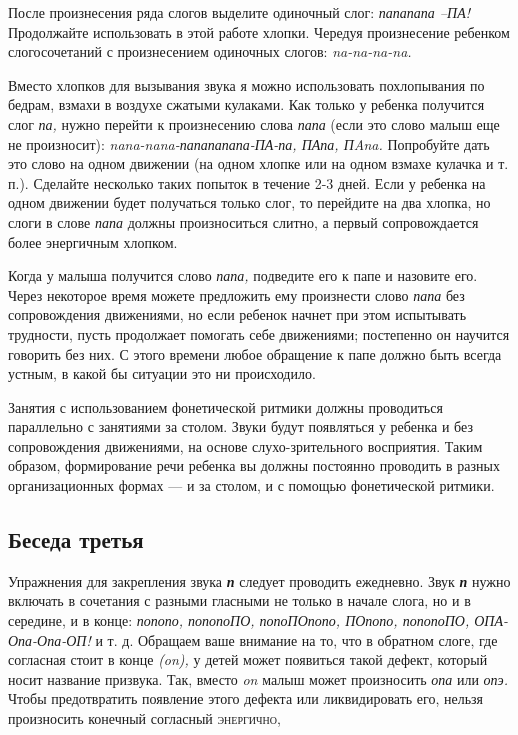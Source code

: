 \documentclass[a5paper]{book}
\renewcommand{\emph}[1]{\textit{#1}}
\begin{document}
После произнесения ряда слогов выделите одиночный слог: \emph{папапапа
--ПА!} Продолжайте использовать в этой работе хлопки. Чередуя
произнесение ребенком слогосочетаний с произнесением одиночных слогов:
\emph{na-na-na-na.}

Вместо хлопков для вызывания звука я можно использовать похлопывания по
бедрам, взмахи в воздухе сжатыми кулаками. Как только у ребенка
получится слог \emph{па,} нужно перейти к произнесению слова \emph{папа}
(если это слово малыш еще не произносит):
\emph{nana-nana-папапапапа-ПА-па, ПАпа, ПAna.} Попробуйте дать это слово
на одном движении (на одном хлопке или на одном взмахе кулачка и т. п.).
Сделайте несколько таких попыток в течение 2-3 дней. Если у ребенка на
одном движении будет получаться только слог, то перейдите на два хлопка,
но слоги в слове \emph{папа} должны произноситься слитно, а первый
сопровождается более энергичным хлопком.

Когда у малыша получится слово \emph{папа,} подведите его к папе и
назовите его. Через некоторое время можете предложить ему произнести
слово \emph{папа} без сопровождения движениями, но если ребенок начнет
при этом испытывать трудности, пусть продолжает помогать себе
движениями; постепенно он научится говорить без них. С этого времени
любое обращение к папе должно быть всегда устным, в какой бы ситуации
это ни происходило.

Занятия с использованием фонетической ритмики должны проводиться
параллельно с занятиями за столом. Звуки будут появляться у ребенка и
без сопровождения движениями, на основе слухо-зрительного восприятия.
Таким образом, формирование речи ребенка вы должны постоянно проводить в
разных организационных формах --- и за столом, и с помощью фонетической
ритмики.

\subsection*{Беседа третья}

Упражнения для закрепления звука \emph{\textbf{п}} следует проводить
ежедневно. Звук \emph{\textbf{п}} нужно включать в сочетания с разными
гласными не только в начале слога, но и в середине, и в конце:
\emph{попопо, попопоПО, попоПОпопо, ПОпопо, попопоПО, ОПА-Опа-Опа-ОП!} и
т. д. Обращаем ваше внимание на то, что в обратном слоге, где согласная
стоит в конце \emph{(on),} у детей может появиться такой дефект, который
носит название призвука. Так, вместо \emph{on} малыш может произносить
\emph{опа} или \emph{опэ.} Чтобы предотвратить появление этого дефекта
или ликвидировать его, нельзя произносить конечный согласный
\textsc{энергично,}
\end{document}

